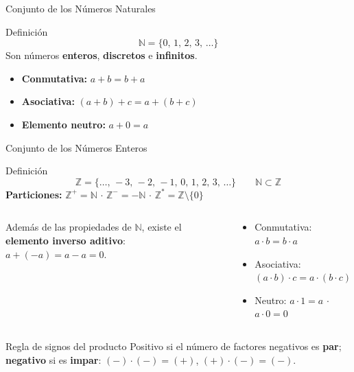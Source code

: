 \documentclass[aspectratio=169]{beamer}
\begin{document}
\begin{frame}{Conjunto de los Números Naturales}
  \begin{block}{Definición}
    \[
      \mathbb{N} = \{0,\, 1,\, 2,\, 3,\, \dots\}
    \]
    Son números \textbf{enteros}, \textbf{discretos} e
    \textbf{infinitos}.
  \end{block}
  \vspace{4pt}
  \begin{mwextra}
    \begin{itemize}
      \item \textbf{Conmutativa:} $a + b = b + a$
      \item \textbf{Asociativa:} $(a + b) + c = a + (b + c)$
      \item \textbf{Elemento neutro:} $a + 0 = a$
    \end{itemize}
  \end{mwextra}
\end{frame}

\begin{frame}{Conjunto de los Números Enteros}
  \begin{block}{Definición}
    \[
      \mathbb{Z} = \{\dots,\, -3,\, -2,\, -1,\, 0,\, 1,\, 2,\, 3,\, \dots\}
    \qquad \mathbb{N} \subset \mathbb{Z}
    \]
    \textbf{Particiones:}\quad
    $\mathbb{Z}^{+} = \mathbb{N}$ \quad$\cdot$\quad
    $\mathbb{Z}^{-} = -\mathbb{N}$ \quad$\cdot$\quad
    $\mathbb{Z}^{*} = \mathbb{Z} \setminus \{0\}$
  \end{block}
  \begin{columns}[T]
    \begin{mwextra}
      Además de las propiedades de $\mathbb{N}$, existe el
      \textbf{elemento inverso aditivo}:
      $a + (-a) = a - a = 0$.
    \end{mwextra}
    \begin{mwextra}
      \begin{itemize}
        \setlength{\itemsep}{1pt}
        \item Conmutativa: $a \cdot b = b \cdot a$
        \item Asociativa: $(a \cdot b) \cdot c = a \cdot (b \cdot c)$
        \item Neutro: $a \cdot 1 = a$ \quad$\cdot$\quad $a \cdot 0 = 0$
      \end{itemize}
    \end{mwextra}
  \end{columns}
  \begin{alertblock}{Regla de signos del producto}
    Positivo si el número de factores negativos es \textbf{par};
    \textbf{negativo} si es \textbf{impar}:
    $(-)\cdot(-) = (+)$, \; $(+)\cdot(-) = (-)$.
  \end{alertblock}
\end{frame}
\end{document}
